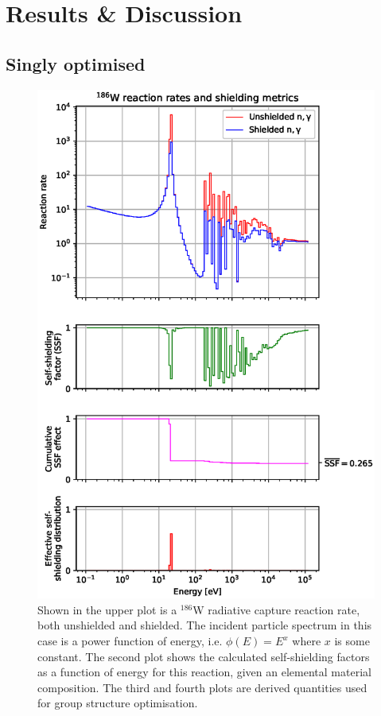 \section{Results \& Discussion}
\label{sec:results}


\subsection{Singly optimised}

\begin{figure}[H]
  \centering
  \includegraphics[width=0.8\linewidth]{W186_gamma}
  \caption{Shown in the upper plot is a $^{186}$W radiative capture reaction rate, both unshielded and shielded. The incident particle spectrum in this case is a power function of energy, i.e. $\phi(E) = E^{x}$ where $x$ is some constant. The second plot shows the calculated self-shielding factors as a function of energy for this reaction, given an elemental material composition. The third and fourth plots are derived quantities used for group structure optimisation.}
  \label{fig:w_cross_section}
\end{figure}

